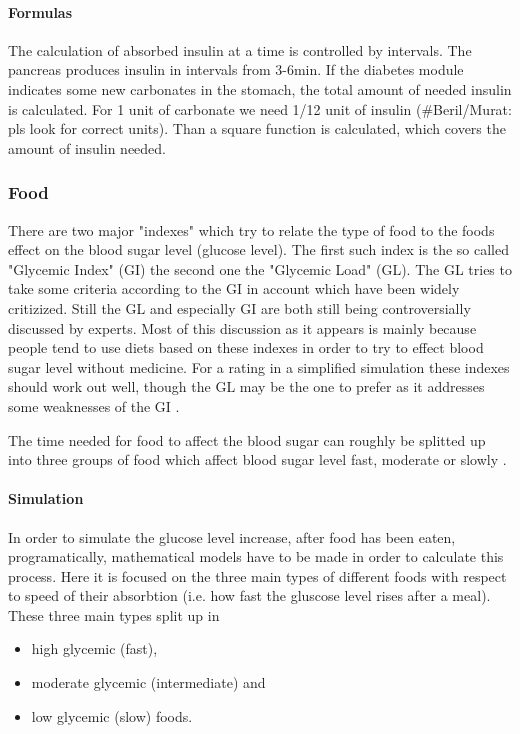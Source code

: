 \paragraph{Formulas}
The calculation of absorbed insulin at a time is controlled by intervals. The pancreas produces insulin in intervals from 3-6min.
If the diabetes module indicates some new carbonates in the stomach, the total amount of needed insulin is calculated.
For 1 unit of carbonate we need 1/12 unit of insulin (\#Beril/Murat: pls look
for correct units). Than a square function is calculated, which covers the amount of insulin needed.

\newpage
\subsubsection{Food}
There are two major "indexes" which try to relate the type of food to the foods effect on the blood sugar level (glucose level).
The first such index is the so called "Glycemic Index" (GI) the second one the "Glycemic Load" (GL).
The GL tries to take some criteria according to the GI in account which have been widely critizized.
Still the GL and especially GI are both still being controversially discussed by experts.
Most of this discussion as it appears is mainly because people tend to use
diets based on these indexes in order to try to effect blood sugar level
without medicine. For a rating in a simplified simulation these indexes should
work out well, though the GL may be the one to prefer as it addresses some
weaknesses of the GI \cite{norden:glycemicindex}.

The time needed for food to affect the blood sugar can roughly be splitted up
into three groups of food which affect blood sugar level fast, moderate or
slowly \cite{mit:glycemicindex}.

\paragraph{Simulation}
In order to simulate the glucose level increase, after food has been eaten, programatically, mathematical models have to be made in order to calculate this process.
Here it is focused on the three main types of different foods with respect to speed of their absorbtion (i.e. how fast the gluscose level rises after a meal).
These three main types split up in

\begin{itemize}
  \item high glycemic (fast),
  \item moderate glycemic (intermediate) and
  \item low glycemic (slow) foods.
\end{itemize}

